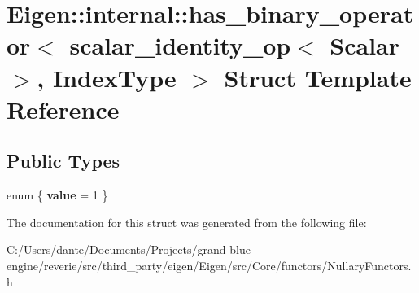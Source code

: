 \hypertarget{struct_eigen_1_1internal_1_1has__binary__operator_3_01scalar__identity__op_3_01_scalar_01_4_00_01_index_type_01_4}{}\section{Eigen\+::internal\+::has\+\_\+binary\+\_\+operator$<$ scalar\+\_\+identity\+\_\+op$<$ Scalar $>$, Index\+Type $>$ Struct Template Reference}
\label{struct_eigen_1_1internal_1_1has__binary__operator_3_01scalar__identity__op_3_01_scalar_01_4_00_01_index_type_01_4}
\subsection*{Public Types}
\begin{DoxyCompactItemize}
\item 
\mbox{\label{struct_eigen_1_1internal_1_1has__binary__operator_3_01scalar__identity__op_3_01_scalar_01_4_00_01_index_type_01_4_abe940382b0d3c64d354291958d671401}} 
enum \{ {\bfseries value} = 1
 \}
\end{DoxyCompactItemize}


The documentation for this struct was generated from the following file\+:\begin{DoxyCompactItemize}
\item 
C\+:/\+Users/dante/\+Documents/\+Projects/grand-\/blue-\/engine/reverie/src/third\+\_\+party/eigen/\+Eigen/src/\+Core/functors/Nullary\+Functors.\+h\end{DoxyCompactItemize}
